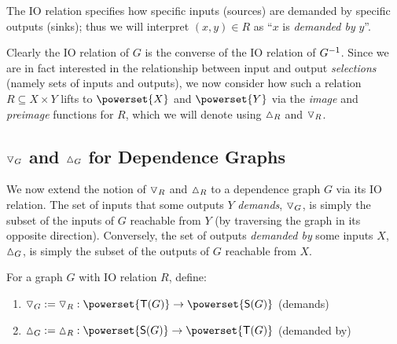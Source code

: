 The IO relation specifies how specific inputs (sources) are demanded by specific outputs (sinks); thus we will
interpret $(x, y) \in R$ as ``$x$ is \textit{demanded by} $y$''.

%
Clearly the IO relation of $G$ is the converse of the IO relation of $G^{-1}$. Since we are in fact
interested in the relationship between input and output \emph{selections} (namely sets of inputs and outputs),
we now consider how such a relation $R \subseteq X \times Y$ lifts to $\powerset{X}$ and $\powerset{Y}$ via
the \textit{image} and \textit{preimage} functions for $R$, which we will denote using $\demandedByR_{R}$ and
$\triangledown_{R}$.

\subsection{$\triangledown_G$ and $\demandedByR_G$ for Dependence Graphs}
\label{sec:conjugate:dependence-graph-functions}

We now extend the notion of $\triangledown_{R}$ and $\demandedByR_{R}$ to a dependence graph $G$ via its IO
relation. The set of inputs that some outputs $Y$ \emph{demands},  $\triangledown_{G}$, is simply the subset of
the inputs of $G$ reachable from $Y$ (by traversing the graph in its opposite direction). Conversely, the set
of outputs \emph{demanded by} some inputs $X$, $\demandedByR_{G}$, is simply the subset of the outputs of $G$
reachable from $X$.

\begin{definition}
   For a graph $G$ with IO relation $R$, define:
   \begin{enumerate}
      \item $\demandsR_G \eqdef \demandsR_{R}: \powerset{\sinks{G}} \to \powerset{\sources{G}}$ \hfill
      (demands)
      \item $\demandedByR_G \eqdef \demandedByR_{R}: \powerset{\sources{G}} \to \powerset{\sinks{G}}$ \hfill
      (demanded by)
   \end{enumerate}
\end{definition}

